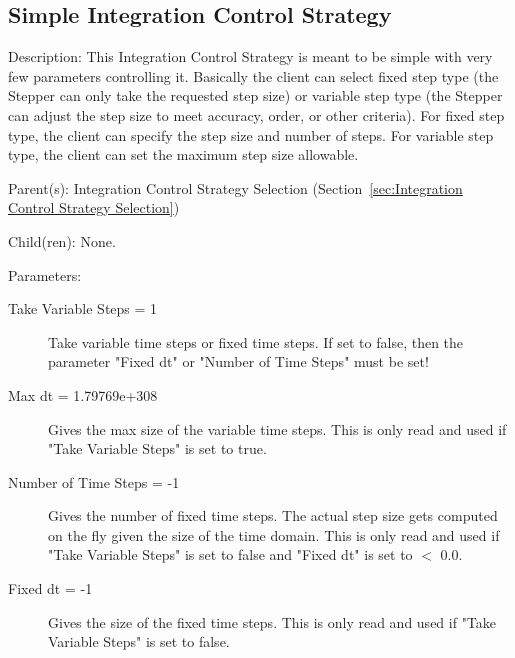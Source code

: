 \subsection{Simple Integration Control Strategy}
\label{sec:Simple Integration Control Strategy}

\begin{list}{}
  {\setlength{\leftmargin}{1.0in}
   \setlength{\labelwidth}{0.75in}
   \setlength{\labelsep}{0.125in}}
  \item[Description:]
    This Integration Control Strategy is meant to be simple with very few parameters controlling it.  Basically the client can select fixed step type (the Stepper can only take the requested step size) or variable step type (the Stepper can adjust the step size to meet accuracy, order, or other criteria).  For fixed step type, the client can specify the step size and number of steps. For variable step type, the client can set the maximum step size allowable.
  \item[Parent(s):]
    Integration Control Strategy Selection (Section~\ref{sec:Integration Control Strategy Selection})
  \item[Child(ren):]
    None. 
  \item[Parameters:]
    \begin{description}
      \item[Take Variable Steps = 1] 
Take variable time steps or fixed time steps.
If set to false, then the parameter "Fixed dt"
or "Number of Time Steps" must be set!
      \item[Max dt = 1.79769e+308] 
Gives the max size of the variable time steps.  This is only read and used if
"Take Variable Steps" is set to true.
      \item[Number of Time Steps = -1] 
Gives the number of fixed time steps.  The actual step size gets computed
on the fly given the size of the time domain.
This is only read and used if "Take Variable Steps" is set to false
and "Fixed dt" is set to $<$ 0.0.
      \item[Fixed dt = -1] 
Gives the size of the fixed time steps.  This is only read and used if
"Take Variable Steps" is set to false.
\end{description}

\end{list}

